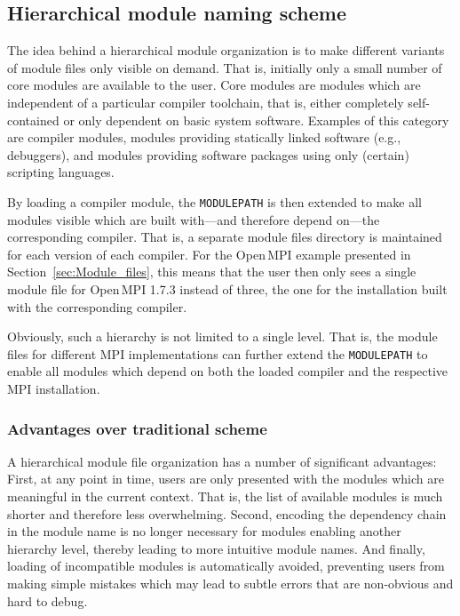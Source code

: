 
\subsection{Hierarchical module naming scheme}

The idea behind a hierarchical module organization is to make different
variants of module files only visible on demand. That is, initially only a
small number of core modules are available to the user. Core modules are
modules which are independent of a particular compiler toolchain, that is,
either completely self-contained or only dependent on basic system software.
Examples of this category are compiler modules, modules providing statically
linked software (e.g., debuggers), and modules providing software packages
using only (certain) scripting languages.

By loading a compiler module, the \texttt{MODULEPATH} is then extended to
make all modules visible which are built with---and therefore depend on---the
corresponding compiler. That is, a separate module files directory is
maintained for each version of each compiler. For the Open\,MPI example
presented in Section~\ref{sec:Module_files}, this means that the user then
only sees a single module file for Open\,MPI 1.7.3 instead of three, the one
for the installation built with the corresponding compiler.

Obviously, such a hierarchy is not limited to a single level. That is, the
module files for different MPI implementations can further extend the
\texttt{MODULEPATH} to enable all modules which depend on both the loaded
compiler and the respective MPI installation.

\subsubsection{Advantages over traditional scheme}

A hierarchical module file organization has a number of significant
advantages: First, at any point in time, users are only presented with the
modules which are meaningful in the current context. That is, the list of
available modules is much shorter and therefore less overwhelming. Second,
encoding the dependency chain in the module name is no longer necessary for
modules enabling another hierarchy level, thereby leading to more intuitive
module names. And finally, loading of incompatible modules is automatically
avoided, preventing users from making simple mistakes which may lead to
subtle errors that are non-obvious and hard to debug.


